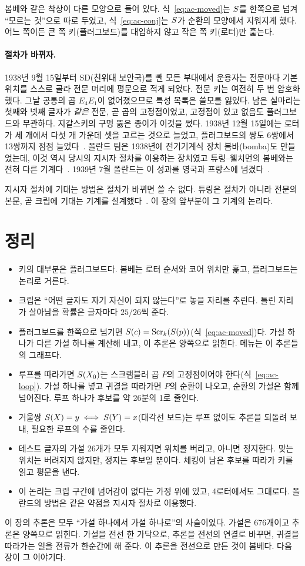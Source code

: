 봄베와 같은 착상이 다른 모양으로 들어 있다. 식~\eqref{eq:ac-moved}는 $S$를 한쪽으로 넘겨 ``모르는 것''으로 따로 두었고,
식~\eqref{eq:ac-conj}는 $S$가 순환의 모양에서 지워지게 했다. 어느 쪽이든 큰 쪽 키(플러그보드)를 대입하지 않고 작은 쪽
키(로터)만 훑는다.

\paragraph{절차가 바뀌자.} 1938년 9월 15일부터 SD(친위대 보안국)를 뺀 모든 부대에서 운용자는 전문마다 기본 위치를
스스로 골라 전문 머리에 평문으로 적게 되었다. 전문 키는 여전히 두 번 암호화했다. 그날 공통의 곱 $E_4E_1$이 없어졌으므로 특성 목록은 쓸모를 잃었다. 남은
실마리는 첫째와 넷째 글자가 \emph{같은} 전문, 곧 곱의 고정점이었고, 고정점이 있고 없음도 플러그보드와 무관하다.
지갈스키의 구멍 뚫은 종이가 이것을 썼다. 1938년 12월 15일에는 로터가 세 개에서 다섯 개 가운데 셋을 고르는 것으로
늘었고, 플러그보드의 쌍도 6쌍에서 13쌍까지 점점 늘었다~\cite{rejewski1980application}. 폴란드 팀은 1938년에 전기기계식 장치
봄바(bomba)도 만들었는데, 이것 역시 당시의 지시자 절차를 이용하는 장치였고 튜링--웰치먼의 봄베와는 전혀 다른
기계다~\cite{cryptomuseum-bombe,jackson-bh03}. 1939년 7월 폴란드는 이 성과를 영국과 프랑스에
넘겼다~\cite{rejewski1980application,gchq-pyry2020}.

지시자 절차에 기대는 방법은 절차가 바뀌면 쓸 수 없다. 튜링은 절차가 아니라 전문의 본문, 곧 크립에 기대는 기계를
설계했다~\cite{jackson-bh06,ellsbury1998bombe,hodges-biography}. 이 장의 앞부분이 그 기계의 논리다.

\section{정리}

\begin{itemize}
\item 키의 대부분은 플러그보드다. 봄베는 로터 순서와 코어 위치만 훑고, 플러그보드는 논리로 거른다.
\item 크립은 ``어떤 글자도 자기 자신이 되지 않는다''로 놓을 자리를 추린다. 틀린 자리가 살아남을 확률은 글자마다 $25/26$씩 준다.
\item 플러그보드를 한쪽으로 넘기면 $S(c) = \mathrm{Scr}_k(S(p))$(식~\eqref{eq:ac-moved})다. 가설 하나가 다른 가설 하나를
계산해 내고, 이 추론은 양쪽으로 읽힌다. 메뉴는 이 추론들의 그래프다.
\item 루프를 따라가면 $S(X_0)$는 스크램블러 곱 $P$의 고정점이어야 한다(식~\eqref{eq:ac-loop}). 가설 하나를 넣고 귀결을
따라가면 $P$의 순환이 나오고, 순환의 가설은 함께 넘어진다. 루프 하나가 후보를 약 26분의 1로 줄인다.
\item 거울쌍 $S(X)=y \iff S(Y)=x$(대각선 보드)는 루프 없이도 추론을 되돌려 보내, 필요한 루프의 수를 줄인다.
\item 테스트 글자의 가설 26개가 모두 지워지면 위치를 버리고, 아니면 정지한다. 맞는 위치는 버려지지 않지만, 정지는 후보일
뿐이다. 체킹이 남은 후보를 따라가 키를 읽고 평문을 낸다.
\item 이 논리는 크립 구간에 넘어감이 없다는 가정 위에 있고, 4로터에서도 그대로다. 폴란드의 방법은 같은 약점을 지시자
절차로 이용했다.
\end{itemize}

이 장의 추론은 모두 ``가설 하나에서 가설 하나로''의 사슬이었다. 가설은 676개이고 추론은 양쪽으로 읽힌다. 가설을 전선
한 가닥으로, 추론을 전선의 연결로 바꾸면, 귀결을 따라가는 일을 전류가 한순간에 해 준다. 이 추론을 전선으로 만든 것이
봄베다. 다음 장이 그 이야기다.
